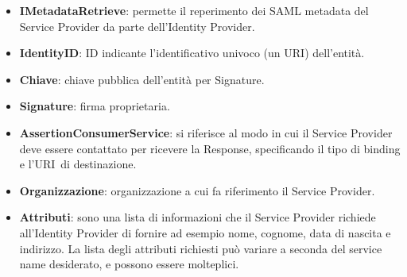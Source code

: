 \begin{itemize}
    \item \textbf{IMetadataRetrieve}: permette il reperimento dei SAML metadata del Service Provider da parte dell’Identity Provider.
    \item \textbf{IdentityID}: ID indicante l’identificativo univoco (un URI\glo) dell’entità.
    \item \textbf{Chiave}: chiave pubblica dell'entità per Signature.
    \item \textbf{Signature}: firma proprietaria.
    \item \textbf{AssertionConsumerService}: si riferisce al modo in cui il Service Provider deve essere contattato per ricevere la Response, specificando il tipo di binding e l'URI\glo\ di destinazione.
    \item \textbf{Organizzazione}: organizzazione a cui fa riferimento il Service Provider.
    \item \textbf{Attributi}: sono una lista di informazioni che il Service Provider richiede all'Identity Provider di fornire ad esempio nome, cognome, data di nascita e indirizzo. La lista degli attributi richiesti può variare a seconda del service name desiderato, e possono essere molteplici.
\end{itemize}
